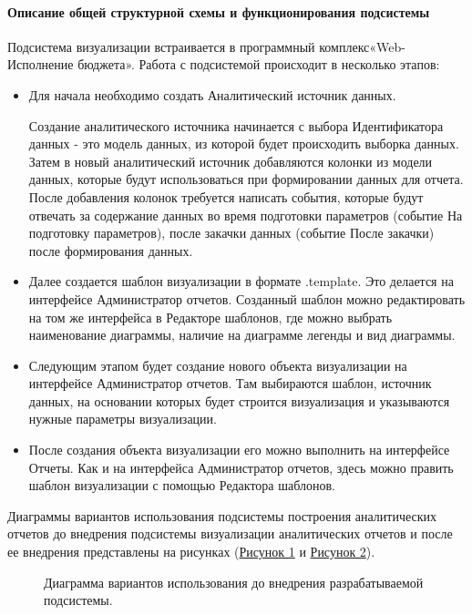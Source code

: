 \documentclass[a4paper]{extarticle}
\begin{document}
\paragraph{Описание общей структурной схемы и функционирования подсистемы}
Подсистема визуализации встраивается в программный комплекс\newline «Web-Исполнение бюджета». Работа с подсистемой происходит в несколько этапов:\par
\begin{itemize}
	\item Для начала необходимо создать Аналитический источник данных.\par
  Создание аналитического источника начинается с выбора Идентификатора данных - это модель данных, из которой будет происходить выборка данных. Затем в новый аналитический источник добавляются колонки из модели данных, которые будут использоваться при формировании данных для отчета. После добавления колонок требуется написать события, которые будут отвечать за содержание данных во время подготовки параметров (событие На подготовку параметров), после закачки данных (событие После закачки) после формирования данных.
	\item Далее создается шаблон визуализации в формате .template. Это делается на интерфейсе Администратор отчетов.
  Созданный шаблон можно редактировать на том же интерфейса в Редакторе шаблонов, где можно выбрать наименование диаграммы, наличие на диаграмме легенды и вид диаграммы.
    \item Следующим этапом будет создание нового объекта визуализации на интерфейсе Администратор отчетов. Там выбираются шаблон, источник данных, на основании которых будет строится визуализация и указываются нужные параметры визуализации.
    \item После создания объекта визуализации его можно выполнить на интерфейсе Отчеты. Как и на интерфейса Администратор отчетов, здесь можно править шаблон визуализации с помощью Редактора шаблонов.
\end{itemize}\par
Диаграммы вариантов использования подсистемы построения аналитических отчетов до внедрения подсистемы визуализации аналитических отчетов и после ее внедрения представлены на рисунках (\hyperref[ris1]{Рисунок 1} и \hyperref[ris2]{Рисунок 2}).
\begin{figure}[H]
\caption{Диаграмма вариантов использования до внедрения разрабатываемой подсистемы.}
\label{ris1}
\end{figure}\par
\end{document}
